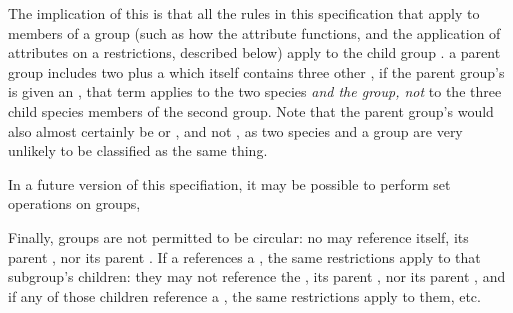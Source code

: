The implication of this is that all the rules in this specification that apply to members of a group (such as how the  attribute functions, and the application of  attributes on a \ListOfMembers restrictions, described below) apply to the child group .   a parent group includes two \Species plus a \Group which itself contains three other \Species, if the parent group's \ListOfMembers is given an , that term applies to the two species \emph{and the group, not} to the three child species members of the second group.  Note that the parent group's  would also almost certainly be  or , and not , as two species and a group are very unlikely to be classified as the same thing.  

In a future version of this specifiation, it may be possible to perform set operations on groups, 

Finally, groups are not permitted to be circular:  no \Member may reference itself, its parent \ListOfMembers, nor its parent \Group.  If a \Member references a \Group, the same restrictions apply to that subgroup's children:  they may not reference the \Member, its parent \ListOfMembers, nor its parent \Group, and if any of those children reference a \Group, the same restrictions apply to them, etc.


